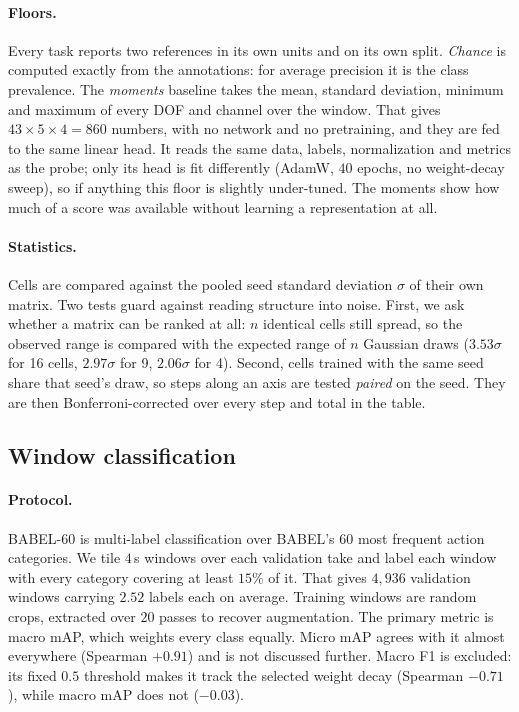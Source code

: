 \paragraph{Floors.} Every task reports two references in its own units and on its own
split. \emph{Chance} is computed exactly from the annotations: for average precision it is
the class prevalence. The \emph{moments} baseline takes the mean, standard deviation,
minimum and maximum of every DOF and channel over the window. That gives
$43\times5\times4 = 860$ numbers, with no network and no pretraining, and they are fed to the
same linear head. It reads the same data, labels, normalization and metrics as the probe;
only its head is fit differently (AdamW, $40$ epochs, no weight-decay sweep), so if anything
this floor is slightly under-tuned. The moments show how much of a score was available
without learning a representation at all.

\paragraph{Statistics.} Cells are compared against the pooled seed standard deviation
$\sigma$ of their own matrix. Two tests guard against reading structure into noise. First,
we ask whether a matrix can be ranked at all: $n$ identical cells still spread, so the
observed range is compared with the expected range of $n$ Gaussian draws ($3.53\sigma$ for
16 cells, $2.97\sigma$ for 9, $2.06\sigma$ for 4). Second, cells trained with the same seed
share that seed's draw, so steps along an axis are tested \emph{paired} on the seed. They
are then Bonferroni-corrected over every step and total in the table.

\subsection{Window classification}
\label{sec:exp-babel-tiled}

\paragraph{Protocol.} BABEL-60 is multi-label classification over BABEL's $60$ most frequent
action categories. We tile $4$\,s windows over each validation take and label each window
with every category covering at least $15\%$ of it. That gives $4{,}936$ validation windows
carrying $2.52$ labels each on average. Training windows are random crops, extracted over
$20$ passes to recover augmentation. The primary metric is macro mAP, which weights every
class equally. Micro mAP agrees with it almost everywhere (Spearman $+0.91$) and is not
discussed further. Macro F1 is excluded: its fixed $0.5$ threshold makes it track the
selected weight decay (Spearman $-0.71$), while macro mAP does not ($-0.03$).

